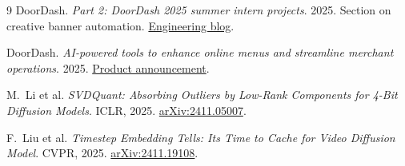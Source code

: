 \documentclass{article}
\begin{document}
\begin{thebibliography}{9}
\small
{}
DoorDash. \emph{Part 2: DoorDash 2025 summer intern projects}. 2025. Section on creative banner automation. \href{https://careersatdoordash.com/blog/part-2-doordash-2025-summer-intern-projects/}{Engineering blog}.

DoorDash. \emph{AI-powered tools to enhance online menus and streamline merchant operations}. 2025. \href{https://about.doordash.com/en-us/news/doordash-unveils-ai-powered-tools-to-enhance-online-menus-and-streamline-merchant-operations}{Product announcement}.

M.~Li et al. \emph{SVDQuant: Absorbing Outliers by Low-Rank Components for 4-Bit Diffusion Models}. ICLR, 2025. \href{https://arxiv.org/abs/2411.05007}{arXiv:2411.05007}.

F.~Liu et al. \emph{Timestep Embedding Tells: It\textquotesingle s Time to Cache for Video Diffusion Model}. CVPR, 2025. \href{https://arxiv.org/abs/2411.19108}{arXiv:2411.19108}.

\end{thebibliography}
\end{document}
